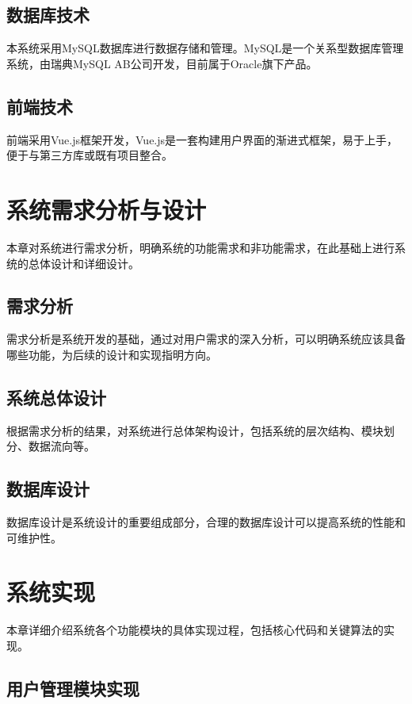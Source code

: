 \documentclass[a4paper,12pt,openany,twoside]{ctexbook}
\begin{document}
\section{数据库技术}

本系统采用MySQL数据库进行数据存储和管理。MySQL是一个关系型数据库管理系统，由瑞典MySQL AB公司开发，目前属于Oracle旗下产品。

\section{前端技术}

前端采用Vue.js框架开发，Vue.js是一套构建用户界面的渐进式框架，易于上手，便于与第三方库或既有项目整合。

\chapter{系统需求分析与设计}

本章对系统进行需求分析，明确系统的功能需求和非功能需求，在此基础上进行系统的总体设计和详细设计。

\section{需求分析}

需求分析是系统开发的基础，通过对用户需求的深入分析，可以明确系统应该具备哪些功能，为后续的设计和实现指明方向。

\section{系统总体设计}

根据需求分析的结果，对系统进行总体架构设计，包括系统的层次结构、模块划分、数据流向等。

\section{数据库设计}

数据库设计是系统设计的重要组成部分，合理的数据库设计可以提高系统的性能和可维护性。

\chapter{系统实现}

本章详细介绍系统各个功能模块的具体实现过程，包括核心代码和关键算法的实现。

\section{用户管理模块实现}
\end{document}
